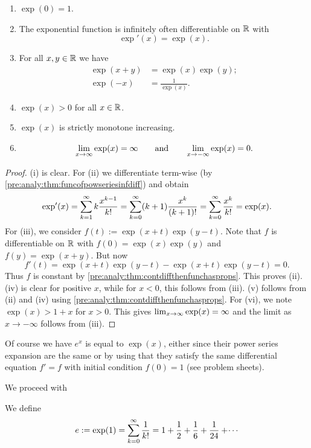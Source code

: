 \documentclass[10pt, a4paper]{article}
\begin{document}
\begin{theorem}
    \begin{enumerate}[label = (\roman*)]
        \item $\exp(0) = 1$.
        \item The exponential function is infinitely often differentiable on $\R$ with
        \[
        \exp'(x) = \exp(x).
        \]
        \item For all $x, y \in \R$ we have
        \begin{align*}
            \exp(x + y) &= \exp(x)\exp(y); \\
            \exp(-x) &= \frac{1}{\exp(x)}.
        \end{align*}
        \item $\exp(x) > 0$ for all $x \in \R$.
        \item $\exp(x)$ is strictly monotone increasing.
        \item
        \[
        \liminfty[x]\exp(x) = \infty\qquad\text{and}\qquad\lim_{x \rightarrow -\infty}\exp(x) = 0.
        \]
    \end{enumerate}
    \begin{proof}
        (i) is clear.
        For (ii) we differentiate term-wise
        (by \autoref{pre:analy:thm:funcofpowseriesinfdiff})
        and obtain
        \[
        \exp'(x) = \infsum k\frac{x ^ {k - 1}}{k!} = \infsumo(k + 1)\frac{x ^ k}{(k + 1)!} = \infsumo\frac{x ^ k}{k!} = \exp(x).
        \]
        For (iii),
        we consider $f(t) := \exp(x + t)\exp(y - t)$.
        Note that $f$ is differentiable on $\R$ with $f(0) = \exp(x)\exp(y)$ and $f(y) = \exp(x + y)$.
        But now
        \[
        f'(t) = \exp(x + t)\exp(y - t) - \exp(x + t)\exp(y - t) = 0.
        \]
        Thus $f$ is constant by \autoref{pre:analy:thm:contdiffthenfunchasprops}.
        This proves (ii).
        (iv) is clear for positive $x$,
        while for $x < 0$,
        this follows from (iii).
        (v) follows from (ii) and (iv) using \autoref{pre:analy:thm:contdiffthenfunchasprops}.
        For (vi),
        we note $\exp(x) > 1 + x$ for $x > 0$.
        This gives $\liminfty[x]\exp(x) = \infty$ and the limit as $x \rightarrow -\infty$ follows from (iii).
    \end{proof}
\end{theorem}

\begin{remark}
    Of course we have $e ^ x$ is equal to $\exp(x)$,
    either since their power series expansion are the same or by using that they satisfy the same differential equation $f' = f$ with initial condition $f(0) = 1$
    (see problem sheets).
\end{remark}
We proceed with
\begin{definition}
    We define
    \[
    e := \exp(1) = \infsumo\frac{1}{k!} = 1 + \frac{1}{2} + \frac{1}{6} + \frac{1}{24} + \dotsi
    \]
\end{definition}
\end{document}

